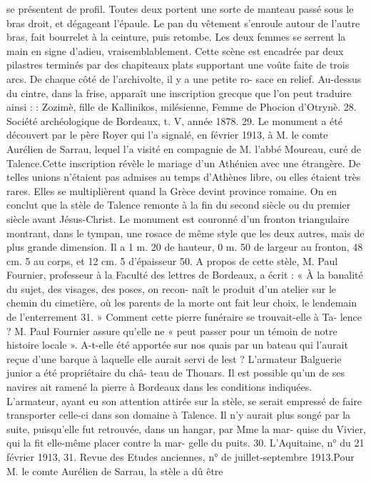 \documentclass[a4paper,11pt]{book}
\begin{document}
se présentent de profil. Toutes deux portent une sorte
de manteau passé sous le bras droit, et dégageant l'épaule.
Le pan du vêtement s'enroule autour de l'autre bras, fait
bourrelet à la ceinture, puis retombe.
Les deux femmes se serrent la main en signe d'adieu,
vraisemblablement.
Cette scène est encadrée par deux pilastres terminés par
des chapiteaux plats supportant une voûte faite de trois
arcs. De chaque côté de l'archivolte, il y a une petite ro-
sace en relief.
Au-dessus du cintre, dans la frise, apparaît une inscription
grecque que l'on peut traduire ainsi :
:
Zozimè, fille de Kallinikos, milésienne,
Femme de Phocion d'Otrynè.
28. Société archéologique de Bordeaux, t. V, année 1878.
29. Le monument a été découvert par le père Royer qui l'a signalé,
en février 1913, à M. le comte Aurélien de Sarrau, lequel l'a visité en
compagnie de M. l'abbé Moureau, curé de Talence.Cette inscription révèle le mariage d'un Athénien avec
une étrangère. De telles unions n'étaient pas admises au
temps d'Athènes libre, ou elles étaient très rares. Elles se
multiplièrent quand la Grèce devint province romaine. On
en conclut que la stèle de Talence remonte à la fin du
second siècle ou du premier siècle avant Jésus-Christ.
Le monument est couronné d'un fronton triangulaire
montrant, dans le tympan, une rosace de même style que
les deux autres, mais de plus grande dimension. Il a
1 m. 20 de hauteur, 0 m. 50 de largeur au fronton, 48 cm. 5
au corps, et 12 cm. 5 d'épaisseur 50.
A propos de cette stèle, M. Paul Fournier, professeur à
la Faculté des lettres de Bordeaux, a écrit :
« À la banalité du sujet, des visages, des poses, on recon-
naît le produit d'un atelier sur le chemin du cimetière, où
les parents de la morte ont fait leur choix, le lendemain
de l'enterrement 31. »
Comment cette pierre funéraire se trouvait-elle à Ta-
lence ? M. Paul Fournier assure qu'elle ne « peut passer
pour un témoin de notre histoire locale ». A-t-elle été
apportée sur nos quais par un bateau qui l'aurait reçue
d'une barque à laquelle elle aurait servi de lest ?
L'armateur Balguerie junior a été propriétaire du châ-
teau de Thouars. Il est possible qu'un de ses navires ait
ramené la pierre à Bordeaux dans les conditions indiquées.
L'armateur, ayant eu son attention attirée sur la stèle,
se serait empressé de faire transporter celle-ci dans son
domaine à Talence. Il n'y aurait plus songé par la suite,
puisqu'elle fut retrouvée, dans un hangar, par Mme la mar-
quise du Vivier, qui la fit elle-même placer contre la mar-
gelle du puits.
30. L'Aquitaine, n° du 21 février 1913,
31. Revue des Etudes anciennes, n° de juillet-septembre 1913.Pour M. le comte Aurélien de Sarrau, la stèle a dû être
\end{document}
